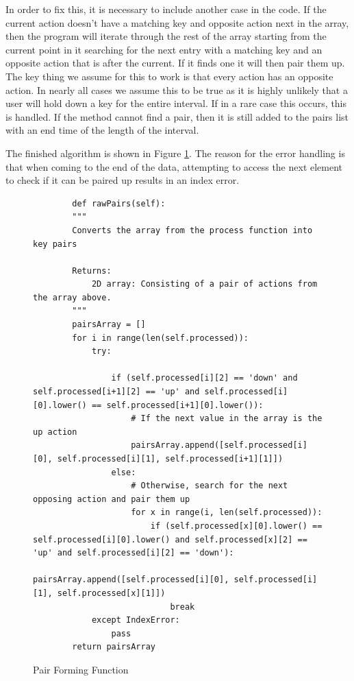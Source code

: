 \documentclass[10pt,a4paper]{report}
\begin{document}
In order to fix this, it is necessary to include another case in the code. If the current action doesn't have a matching key and opposite action next in the array, then the program will iterate through the rest of the array starting from the current point in it searching for the next entry with a matching key and an opposite action that is after the current. If it finds one it will then pair them up. The key thing we assume for this to work is that every action has an opposite action. In nearly all cases we assume this to be true as it is highly unlikely that a user will hold down a key for the entire interval. If in a rare case this occurs, this is handled. If the method cannot find a pair, then it is still added to the pairs list with an end time of the length of the interval.

The finished algorithm is shown in Figure \ref{fig:PairForm}. The reason for the error handling is that when coming to the end of the data, attempting to access the next element to check if it can be paired up results in an index error.
\begin{figure}[h!]
	\begin{lstlisting}
		def rawPairs(self):
        """
        Converts the array from the process function into key pairs

        Returns:
            2D array: Consisting of a pair of actions from the array above.
        """
        pairsArray = []
        for i in range(len(self.processed)):
            try:
                
                if (self.processed[i][2] == 'down' and self.processed[i+1][2] == 'up' and self.processed[i][0].lower() == self.processed[i+1][0].lower()):
                    # If the next value in the array is the up action
                    pairsArray.append([self.processed[i][0], self.processed[i][1], self.processed[i+1][1]])
                else:
                    # Otherwise, search for the next opposing action and pair them up
                    for x in range(i, len(self.processed)):
                        if (self.processed[x][0].lower() == self.processed[i][0].lower() and self.processed[x][2] == 'up' and self.processed[i][2] == 'down'):
                            pairsArray.append([self.processed[i][0], self.processed[i][1], self.processed[x][1]])
                            break        
            except IndexError:
                pass
        return pairsArray
	\end{lstlisting}
	\caption{Pair Forming Function}
	\label{fig:PairForm}
\end{figure}
\end{document}
